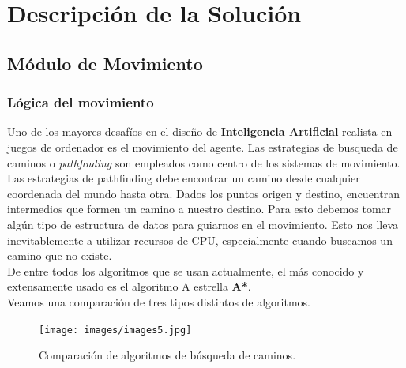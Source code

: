 \documentclass[a4paper,12pt,oneside]{book}
\begin{document}
\chapter{Descripción de la Solución}

\section {Módulo de Movimiento}

\subsection{Lógica del movimiento}
Uno de los mayores desafíos en el diseño de {\bf Inteligencia
  Artificial} realista en juegos de ordenador es el movimiento del
agente. Las estrategias de busqueda de caminos o {\it pathfinding} son
empleados como centro de los sistemas de movimiento.\\

Las estrategias de pathfinding debe encontrar un camino desde
cualquier coordenada del mundo hasta otra. Dados los puntos origen y
destino, encuentran intermedios que formen un camino a nuestro
destino. Para esto debemos tomar algún tipo de estructura de datos
para guiarnos en el movimiento. Esto nos lleva inevitablemente a
utilizar recursos de CPU, especialmente cuando buscamos un camino que
no existe.\\

De entre todos los algoritmos que se usan actualmente, el más conocido
y extensamente usado es el algoritmo A estrella {\bf A*}. \\

Veamos una comparación de tres tipos distintos de algoritmos.
\begin{figure}[!h]
  \centering
  \texttt{[image: images/images5.jpg]}\label{comp}
  \caption{Comparación de algoritmos de búsqueda de caminos.}
\end{figure}
\end{document}
